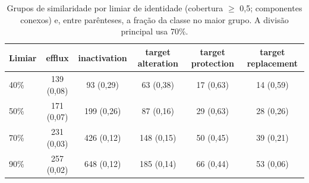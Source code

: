 \begin{table}[htbp]
  \centering
  \caption{Grupos de similaridade por limiar de identidade (cobertura $\geq$ 0,5; componentes conexos) e, entre parênteses, a fração da classe no maior grupo. A divisão principal usa 70\%.}
  \label{tab:grupos}
  \begin{tabular}{lccccc}
    \toprule
    Limiar & efflux & inactivation & target alteration & target protection & target replacement \\
    \midrule
    40\% & 139 (0,08) & 93 (0,29) & 63 (0,38) & 17 (0,63) & 14 (0,59) \\
    50\% & 171 (0,07) & 199 (0,26) & 87 (0,16) & 29 (0,63) & 28 (0,26) \\
    70\% & 231 (0,03) & 426 (0,12) & 148 (0,15) & 50 (0,45) & 39 (0,21) \\
    90\% & 257 (0,02) & 648 (0,12) & 185 (0,14) & 66 (0,44) & 53 (0,06) \\
    \bottomrule
  \end{tabular}
\end{table}
